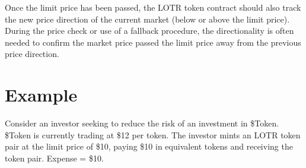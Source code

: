 \documentclass[12pt]{article}
\begin{document}
            Once the limit price has been passed, the LOTR token contract should also track the new price direction of the current market (below or above the limit price). During the price check or use of a fallback procedure, the directionality is often needed to confirm the market price passed the limit price away from the previous price direction.

   \section*{Example}
      Consider an investor seeking to reduce the risk of an investment in \$Token. \$Token is currently trading at \$12 per token. The investor mints an LOTR token pair at the limit price of \$10, paying \$10 in equivalent tokens and receiving the token pair. Expense = \$10.
\end{document}
